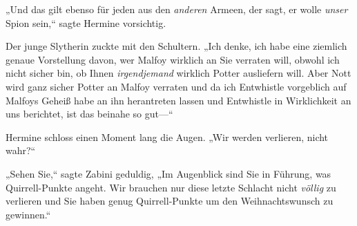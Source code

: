 „Und das gilt ebenso für jeden aus den \emph{anderen} Armeen, der sagt, er wolle \emph{unser} Spion sein,“ sagte Hermine vorsichtig.

Der junge Slytherin zuckte mit den Schultern. „Ich denke, ich habe eine ziemlich genaue Vorstellung davon, wer Malfoy wirklich an Sie verraten will, obwohl ich nicht sicher bin, ob Ihnen \emph{irgendjemand} wirklich Potter ausliefern will. Aber Nott wird ganz sicher Potter an Malfoy verraten und da ich Entwhistle vorgeblich auf Malfoys Geheiß habe an ihn herantreten lassen und Entwhistle in Wirklichkeit an uns berichtet, ist das beinahe so gut—“

Hermine schloss einen Moment lang die Augen. „Wir werden verlieren, nicht wahr?“

„Sehen Sie,“ sagte Zabini geduldig, „Im Augenblick sind Sie in Führung, was Quirrell-Punkte angeht. Wir brauchen nur diese letzte Schlacht nicht \emph{völlig} zu verlieren und Sie haben genug Quirrell-Punkte um den Weihnachtswunsch zu gewinnen.“

